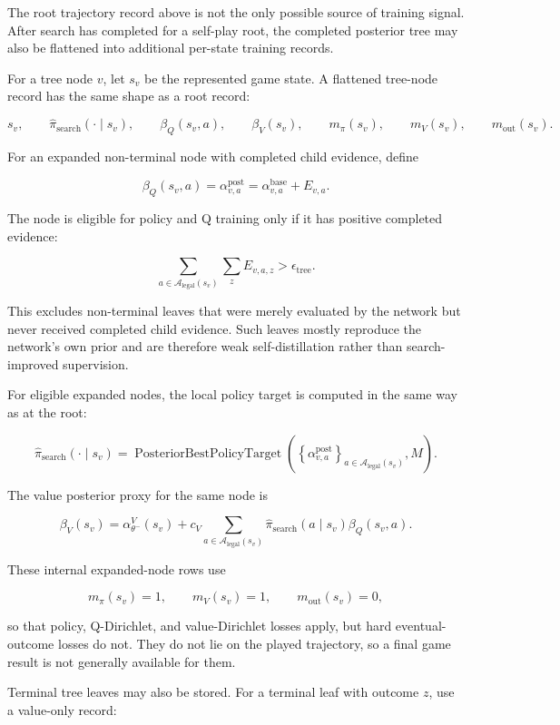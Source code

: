 \documentclass[11pt]{article}
\newcommand{\Legal}{\mathcal{A}_{\mathrm{legal}}}
\newcommand{\PosteriorBestPolicyTarget}{\operatorname{PosteriorBestPolicyTarget}}
\begin{document}
The root trajectory record above is not the only possible source of training
signal. After search has completed for a self-play root, the completed posterior
tree may also be flattened into additional per-state training records.

For a tree node \(v\), let \(s_v\) be the represented game state. A flattened
tree-node record has the same shape as a root record:

\[
s_v,
\qquad
\hat{\pi}_{\mathrm{search}}(\cdot\mid s_v),
\qquad
\beta_Q(s_v,a),
\qquad
\beta_V(s_v),
\qquad
m_\pi(s_v),
\qquad
m_V(s_v),
\qquad
m_{\mathrm{out}}(s_v).
\]

For an expanded non-terminal node with completed child evidence, define

\[
\beta_Q(s_v,a)
=
\alpha^{\mathrm{post}}_{v,a}
=
\alpha^{\mathrm{base}}_{v,a}
+
E_{v,a}.
\]

The node is eligible for policy and Q training only if it has positive completed
evidence:

\[
\sum_{a\in\Legal(s_v)}
\sum_z E_{v,a,z}
>
\epsilon_{\mathrm{tree}}.
\]

This excludes non-terminal leaves that were merely evaluated by the network but
never received completed child evidence. Such leaves mostly reproduce the
network's own prior and are therefore weak self-distillation rather than
search-improved supervision.

For eligible expanded nodes, the local policy target is computed in the same way
as at the root:

\[
\hat{\pi}_{\mathrm{search}}(\cdot\mid s_v)
=
\PosteriorBestPolicyTarget
\left(
\left\{
\alpha^{\mathrm{post}}_{v,a}
\right\}_{a\in\Legal(s_v)},
M
\right).
\]

The value posterior proxy for the same node is

\[
\beta_V(s_v)
=
\alpha_{\theta^-}^V(s_v)
+
c_V
\sum_{a\in\Legal(s_v)}
\hat{\pi}_{\mathrm{search}}(a\mid s_v)
\beta_Q(s_v,a).
\]

These internal expanded-node rows use

\[
m_\pi(s_v)=1,
\qquad
m_V(s_v)=1,
\qquad
m_{\mathrm{out}}(s_v)=0,
\]

so that policy, Q-Dirichlet, and value-Dirichlet losses apply, but hard
eventual-outcome losses do not. They do not lie on the played trajectory, so a
final game result is not generally available for them.

Terminal tree leaves may also be stored. For a terminal leaf with outcome \(z\),
use a value-only record:
\end{document}
